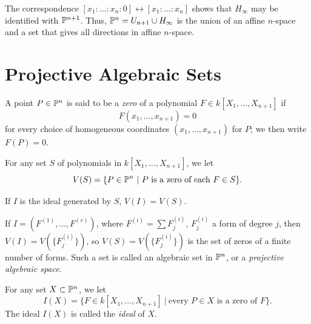 \begin{remark}
	The correspondence $[x_{1} : \ldots : x_{n} : 0] \leftrightarrow [x_{1} : \ldots : x_{n}]$ shows that $H_{\infty}$ may be identified with $\mathbb{P}^{n+1}$. Thus, $\mathbb{P}^{n} = U_{n+1} \cup H_{\infty}$ is the union of an affine $n$-space and a set that gives all directions in affine $n$-space.
\end{remark}


\section{Projective Algebraic Sets}
\begin{definition}
	A point $P \in \mathbb{P}^{n}$ is said to be a \textit{zero} of a polynomial $F \in k[X_{1},\ldots,X_{n+1}]$  if 
	\[ F(x_{1},\ldots,x_{n+1}) = 0 \]
	for every choice of homogeneous coordinates $(x_{1},\ldots,x_{n+1})$ for $P$; we then write $F(P) = 0$.
\end{definition}

\begin{definition}
	For any set $S$ of polynomials in $k[X_{1},\ldots,X_{n+1}]$, we let 
	\[ V(S) = \{P \in \mathbb{P}^{n} \ | \ P \text{ is a zero of each } F \in S\}. \]
\end{definition}

\begin{remark}
	If $I$ is the ideal generated by $S$, $V(I) = V(S)$.
\end{remark}

\begin{definition}
	If $I = (F^{(1)}, \ldots, F^{(r)})$, where $F^{(i)} = \sum F_{j}^{(i)}$, $F_{j}^{(i)}$ a form of degree $j$, then $V(I) = V(\{F_{j}^{(i)}\})$, so $V(S) = V(\{F_{j}^{(i)}\})$ is the set of zeros of a finite number of forms. Such a set is called an algebraic set in $\mathbb{P}^{n}$, or a \textit{projective algebraic space}.
\end{definition}

\begin{definition}
	For any set $X \subset \mathbb{P}^{n}$, we let 
	\[ I(X) = \{F \in k[X_{1},\ldots,X_{n+1}] \ | \ \text{every $P \in X$ is a zero of $F$}\}. \]
	The ideal $I(X)$ is called the \textit{ideal} of $X$. 
\end{definition}

